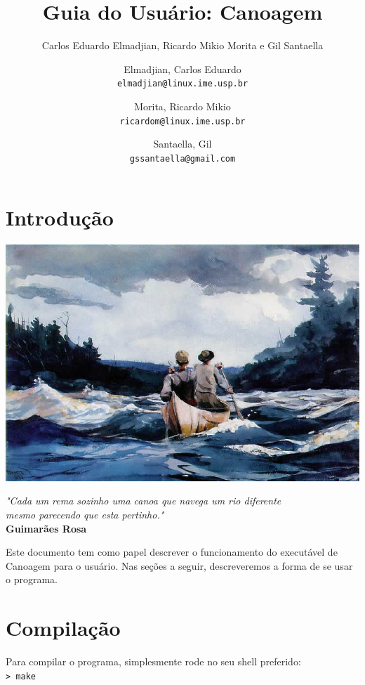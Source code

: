 \documentclass[11pt,a4paper]{article}
\author{Carlos Eduardo Elmadjian, Ricardo Mikio Morita e Gil Santaella}
\author{
  Elmadjian, Carlos Eduardo\\
  \texttt{elmadjian@linux.ime.usp.br}
  \and
  Morita, Ricardo Mikio\\
  \texttt{ricardom@linux.ime.usp.br}
  \and
  Santaella, Gil\\
  \texttt{gssantaella@gmail.com}
}
\title{Guia do Usuário: Canoagem}
\begin{document}
\maketitle

\section*{Introdução}
\thispagestyle{empty}
\vspace{1cm}
\begin{center}
\includegraphics[scale=3.5]{CanoeInTheRapids.jpg}
\end{center}
\vspace{1cm}
\begin{flushright}
{\footnotesize \textit{"Cada um rema sozinho uma canoa que navega um rio diferente\\
 mesmo parecendo que esta pertinho."}\\ \textbf{Guimarães Rosa}}
\end{flushright}

Este documento tem como papel descrever o funcionamento do executável de Canoagem para o usuário. Nas seções a seguir, descreveremos a forma de se usar o programa.

\section{Compilação}
\setcounter{page}{1}

Para compilar o programa, simplesmente rode no seu shell preferido:\\

\verb|> make| \\
\end{document}
